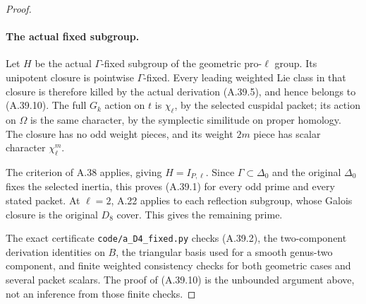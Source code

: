 \begin{proof}
\paragraph{The actual fixed subgroup.}
Let \(H\) be the actual \(\Gamma\)-fixed subgroup
of the geometric pro-\(\ell\) group. Its unipotent
closure is pointwise \(\Gamma\)-fixed. Every
leading weighted Lie class in that closure is
therefore killed by the actual derivation (A.39.5),
and hence belongs to (A.39.10). The full \(G_k\)
action on \(t\) is \(\chi_\ell\), by the selected
cuspidal packet; its action on \(\Omega\) is the
same character, by the symplectic similitude on
proper homology. The closure has no odd weight
pieces, and its weight \(2m\) piece has scalar
character \(\chi_\ell^m\).

The criterion of A.38 applies, giving \(H=I_{P,\ell}\).
Since \(\Gamma\subset\Delta_0\) and the original
\(\Delta_0\) fixes the selected inertia, this proves
(A.39.1) for every odd prime and every stated packet.
At \(\ell=2\), A.22 applies to each reflection
subgroup, whose Galois closure is the original
\(D_8\) cover. This gives the remaining prime.

The exact certificate \texttt{code/a\_D4\_fixed.py}
checks (A.39.2), the two-component derivation
identities on \(B\), the triangular basis used for
a smooth genus-two component, and finite weighted
consistency checks for both geometric cases and
several packet scalars. The proof of (A.39.10)
is the unbounded argument above, not an inference
from those finite checks.
\end{proof}
